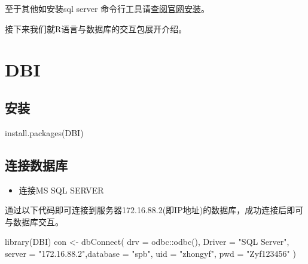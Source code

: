 \documentclass[
]{book}
\newenvironment{Shaded}{\begin{snugshade}}{\end{snugshade}}
\newcommand{\AttributeTok}[1]{\textcolor[rgb]{0.77,0.63,0.00}{#1}}
\newcommand{\FunctionTok}[1]{\textcolor[rgb]{0.00,0.00,0.00}{#1}}
\newcommand{\NormalTok}[1]{#1}
\newcommand{\OtherTok}[1]{\textcolor[rgb]{0.56,0.35,0.01}{#1}}
\newcommand{\SpecialCharTok}[1]{\textcolor[rgb]{0.00,0.00,0.00}{#1}}
\newcommand{\StringTok}[1]{\textcolor[rgb]{0.31,0.60,0.02}{#1}}
\providecommand{\tightlist}{%
  \setlength{\itemsep}{0pt}\setlength{\parskip}{0pt}}
\begin{document}
至于其他如安装sql server 命令行工具请\href{https://docs.microsoft.com/zh-cn/sql/linux/quickstart-install-connect-ubuntu?view=sql-server-linux-ver15\&preserve-view=true}{查阅官网安装}。

接下来我们就R语言与数据库的交互包展开介绍。

\hypertarget{dbi}{%
\section{DBI}\label{dbi}}

\hypertarget{ux5b89ux88c5-7}{%
\subsection{安装}\label{ux5b89ux88c5-7}}

\begin{Shaded}
\begin{Highlighting}[]
\FunctionTok{install.packages}\NormalTok{(}\StringTok{\textquotesingle{}DBI\textquotesingle{}}\NormalTok{)}
\end{Highlighting}
\end{Shaded}

\hypertarget{ux8fdeux63a5ux6570ux636eux5e93}{%
\subsection{连接数据库}\label{ux8fdeux63a5ux6570ux636eux5e93}}

\begin{itemize}
\tightlist
\item
  连接MS SQL SERVER
\end{itemize}

通过以下代码即可连接到服务器172.16.88.2(即IP地址)的数据库，成功连接后即可与数据库交互。

\begin{Shaded}
\begin{Highlighting}[]
\FunctionTok{library}\NormalTok{(DBI)}
\NormalTok{con }\OtherTok{\textless{}{-}} \FunctionTok{dbConnect}\NormalTok{(}
  \AttributeTok{drv =}\NormalTok{ odbc}\SpecialCharTok{::}\FunctionTok{odbc}\NormalTok{(), }\AttributeTok{Driver =} \StringTok{"SQL Server"}\NormalTok{, }\AttributeTok{server =} \StringTok{"172.16.88.2"}\NormalTok{,}\AttributeTok{database =} \StringTok{"spb"}\NormalTok{, }\AttributeTok{uid =} \StringTok{"zhongyf"}\NormalTok{, }\AttributeTok{pwd =} \StringTok{"Zyf123456"}
\NormalTok{)}
\end{Highlighting}
\end{Shaded}
\end{document}
